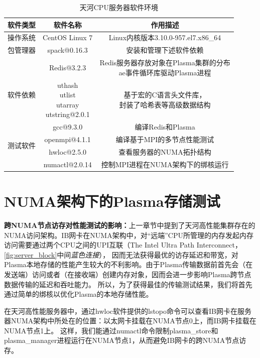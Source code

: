 \begin{table}[h]
    \centering
    \caption{天河CPU服务器软件环境}
    \begin{tabular}{*{3}{c}}
        \toprule
        软件类型 & 软件名称  & 作用描述 \\
        \midrule
        操作系统 & CentOS Linux 7 & Linux内核版本3.10.0-957.el7.x86\_64 \\
        \midrule
        包管理器 & spack@0.16.3 & 安装和管理下述软件依赖 \\
        \midrule
        \multirow{3}{*}{软件依赖} & Redis@3.2.3 & \makecell{Redis服务器存放对象在Plasma集群的分布 \\ ae事件循环库驱动Plasma进程} \\
    	 & \makecell{uthash \\ utlist \\ utarray \\ utstring}@2.0.1 & \makecell{基于宏的C语言头文件库，\\ 封装了哈希表等高级数据结构} \\
		 & gcc@9.3.0 & 编译Redis和Plasma \\
        \midrule
    	\multirow{2}{*}{测试软件} & openmpi@4.1.1 & 编译基于MPI的多节点性能测试 \\
		& hwloc@2.5.0 & 查看服务器的NUMA拓扑结构 \\
		& numactl@2.0.14 & 控制MPI进程在NUMA架构下的绑核运行 \\
        \bottomrule
    \end{tabular}
    \label{tab:software_config}
\end{table}

\section{NUMA架构下的Plasma存储测试}

\textbf{跨NUMA节点访存对性能测试的影响：}上一章节中提到了天河高性能集群存在的NUMA访问架构。IB网卡在NUMA架构中，对“远端”CPU所管理的内存发起内存访问需要通过两个CPU之间的UPI互联（The Intel Ultra Path Interconnect，\autoref{fig:server_block}中间\textit{蓝色连接}），
因而无法获得最优的访存延迟和带宽，对Plasma本地存储的性能产生较大的不利影响。由于Plasma传输数据前首先会（在发送端）访问或者（在接收端）创建内存对象，因而会进一步影响Plasma跨节点数据传输的延迟和吞吐能力。
所以，为了获得最佳的传输测试结果，我们将首先通过简单的绑核以优化Plasma的本地存储性能。

在天河高性能服务器中，通过hwloc软件提供的lstopo命令可以查看IB网卡在服务器NUMA架构中所处在的位置：以太网卡挂载在NUMA节点0上，而IB网卡挂载在NUMA节点1上。
这样，我们能通过numactl命令限制plasma\_store和plasma\_manager进程运行在NUMA节点1，从而避免IB网卡的跨NUMA节点访存。

